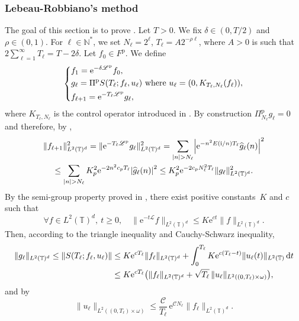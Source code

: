 \documentclass[JEP,XML,SOM,Unicode,NoEqCountersInSection]{cedram}
\let\mathcal\mathscr
\theoremstyle{plain}
\theoremstyle{definition}
\theoremstyle{remark}
\newcommand{\diff}[1][-3]{\ensuremath{\mathop{}\mkern#1mu\mathrm{d}}}
\newcommand{\set}{\mathbb}
\newcommand{\T}{\set{T}}
\newcommand{\p}{{\mathrm p}}
\newcommand{\eu}{\mathrm e}
\newcommand{\iu}{\mathrm i}
\let\originalleft\left
\let\originalright\right
\renewcommand{\left}{\mathopen{}\mathclose\bgroup\originalleft}
\renewcommand{\right}{\aftergroup\egroup\originalright}
\newcommand{\ssqrt}[1]{\sqrt{\smash[b]{#1}}}
\begin{document}
\subsubsection{Lebeau-Robbiano's method} \label{Subsec:LR}

The goal of this section is to prove . Let $T>0$.
We fix $\delta \in (0,T/2)$ and $\rho \in (0,1)$.
For $\ell \in \set N^*$, we set $N_\ell=2^\ell$, $T_{\ell}=A2^{-\rho \ell}$, where $A>0$ is such that $2\sum_{\ell=1}^\infty T_\ell = T - 2\delta$.
Let $f_0 \in F^\p$. We define
\[
\left\lbrace\begin{aligned}
& f_1=\eu^{-\delta \mathcal{L}^\p} f_0, \\
& g_\ell = \Pi^\p S(T_\ell ; f_\ell, u_\ell) \text{ where } u_\ell = \left(0,K_{T_\ell,N_\ell}(f_\ell)\right), \\
& f_{\ell+1}=\eu^{-T_\ell \mathcal{L}^\p} g_\ell,
\end{aligned}\right.
\]
where $K_{T_\ell,N_\ell}$ is the control operator introduced in . By construction $\Pi^\p_{N_\ell} g_\ell=0$ and therefore, by ,
\begin{multline*}
\|f_{\ell+1}\|_{L^2(\T)^d}^2 = \| \eu^{-T_\ell \mathcal{L}^\p} g_\ell \|_{L^2(\T)^d}^2
= \sum_{|n|>N_\ell} \left\lvert \eu^{-n^2 E(\iu/n)T_\ell} \widehat{g}_\ell(n) \right\rvert^2 \\
\leq \sum_{|n|>N_\ell} K_p^2 \eu^{-2 n^2 c_p T_\ell} \left\lvert \widehat{g}_\ell(n) \right\rvert^2
\leq K_p^2 \eu^{-2 c_p N_\ell^2 T_\ell} \|g_\ell\|_{L^2(\T)^d}^2.
\end{multline*}
By the semi-group property proved in , there exist positive constants~$K$ and $c$ such that
\[
\forall f \in L^2(\T)^d,\ t\geq 0, \quad \| \eu^{-t\mathcal{L}} f \|_{L^2(\T)^d}\leq K \eu^{ct} \|f\|_{L^2(\T)^d}.
\]
Then, according to the triangle inequality and Cauchy-Schwarz inequality,
\begin{align*}
\|g_\ell\|_{L^2(\T)^d}
\leq \| S(T_\ell ; f_\ell, u_\ell) \|
& \leq K \eu^{cT_\ell} \|f_\ell\|_{L^2(\T)^d} + \int_0^{T_\ell} K \eu^{c(T_\ell-t)} \|u_\ell(t)\|_{L^2(\T)} \diff t \\
& \leq K \eu^{cT_\ell} \bigl(\|f_\ell\|_{L^2(\T)^d} + \ssqrt{T_\ell}\, \|u_\ell\|_{L^2((0,T_\ell)\times\omega)} \bigr),
\end{align*}
and by 
\begin{equation}\label{Control:EstimationL2}
\| u_\ell \|_{L^2((0,T_\ell)\times\omega)} \leq \frac{\mathcal{C}}{T_\ell}\, \eu^{\mathcal{C} N_\ell} \|f_\ell\|_{L^2(\T)^d}.
\end{equation}
\end{document}
